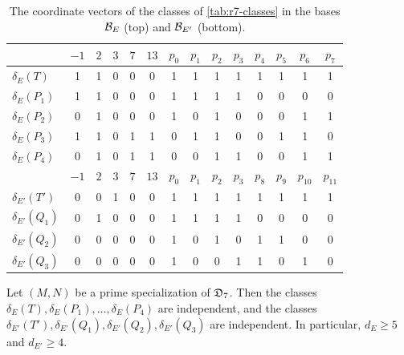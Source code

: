 \begin{table}[htbp]
\centering
\caption{The coordinate vectors of the classes of \cref{tab:r7-classes} in
the bases $\mathcal B_E$ (top) and $\mathcal B_{E'}$ (bottom).}
\label{tab:r7-vectors}
\small
\setlength{\tabcolsep}{4pt}
\begin{tabular}{l@{\hspace{10pt}}ccccc@{\hspace{12pt}}cccccccc}
\toprule
 & $-1$ & $2$ & $3$ & $7$ & $13$ & $p_0$ & $p_1$ & $p_2$ & $p_3$ & $p_4$ & $p_5$ & $p_6$ & $p_7$\\
\midrule
$\delta_E(T)$ & 1 & 1 & 0 & 0 & 0 & 1 & 1 & 1 & 1 & 1 & 1 & 1 & 1\\
$\delta_E(P_1)$ & 1 & 1 & 0 & 0 & 0 & 1 & 1 & 1 & 1 & 0 & 0 & 0 & 0\\
$\delta_E(P_2)$ & 0 & 1 & 0 & 0 & 0 & 1 & 0 & 1 & 0 & 0 & 0 & 1 & 1\\
$\delta_E(P_3)$ & 1 & 1 & 0 & 1 & 1 & 0 & 1 & 1 & 0 & 0 & 1 & 1 & 0\\
$\delta_E(P_4)$ & 0 & 1 & 0 & 1 & 1 & 0 & 0 & 1 & 1 & 0 & 0 & 1 & 1\\
\midrule
 & $-1$ & $2$ & $3$ & $7$ & $13$ & $p_0$ & $p_1$ & $p_2$ & $p_3$ & $p_8$ & $p_9$ & $p_{10}$ & $p_{11}$\\
\midrule
$\delta_{E'}(T')$ & 0 & 0 & 1 & 0 & 0 & 1 & 1 & 1 & 1 & 1 & 1 & 1 & 1\\
$\delta_{E'}(Q_1)$ & 0 & 1 & 0 & 0 & 0 & 1 & 1 & 1 & 1 & 0 & 0 & 0 & 0\\
$\delta_{E'}(Q_2)$ & 0 & 0 & 0 & 0 & 0 & 1 & 0 & 1 & 0 & 1 & 1 & 0 & 0\\
$\delta_{E'}(Q_3)$ & 0 & 0 & 0 & 0 & 0 & 1 & 0 & 0 & 1 & 1 & 0 & 1 & 0\\
\bottomrule
\end{tabular}
\end{table}

\begin{lemma}\label{lem:r7-independent}
Let $(M,N)$ be a prime specialization of $\mathfrak D_7$. Then the classes
$\delta_E(T),\delta_E(P_1),\dots,\delta_E(P_4)$ are independent, and the
classes $\delta_{E'}(T'),\delta_{E'}(Q_1),\delta_{E'}(Q_2),\delta_{E'}(Q_3)$
are independent. In particular, $d_E\ge5$ and $d_{E'}\ge4$.
\end{lemma}

